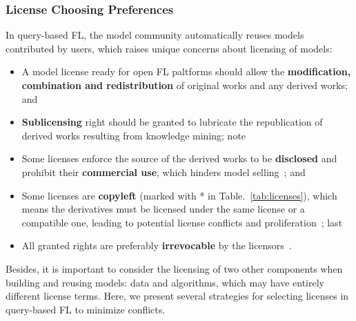 

\subsubsection{License Choosing Preferences}
\label{sec:choosing}
In query-based FL, the model community automatically reuses models contributed by users, which raises unique concerns about licensing of models:
\begin{itemize}
  \item A model license ready for open FL paltforms should allow the \textbf{modification, combination and redistribution} of original works and any derived works; and
  \item \textbf{Sublicensing} right should be granted to lubricate the republication of derived works resulting from knowledge mining; note
  \item Some licenses enforce the source of the derived works to be \textbf{disclosed} and prohibit their \textbf{commercial use}, which hinders model selling~\cite{chen2019towards}; and
  \item Some licenses are \textbf{copyleft} (marked with * in Table.~\ref{tab:licenses}), which means the derivatives must be licensed under the same license or a compatible one, leading to potential license conflicts and proliferation~\cite{gomulkiewicz2009open}; last
  \item All granted rights are preferably \textbf{irrevocable} by the licensors~\cite{reddy2009jacobsen}.
\end{itemize}

Besides, it is important to consider the licensing of two other components when building and reusing models: data and algorithms, which may have entirely different license terms. 
Here, we present several strategies for selecting licenses in query-based FL to minimize conflicts.

